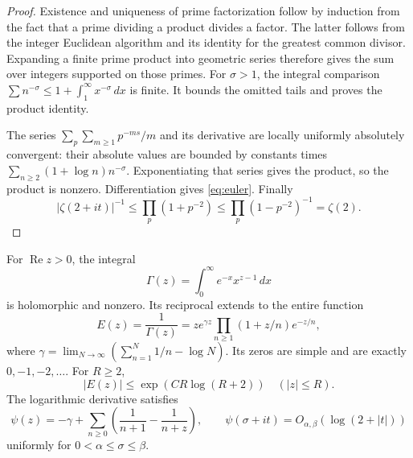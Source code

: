 \begin{proof}
Existence and uniqueness of prime factorization follow by induction from
the fact that a prime dividing a product divides a factor.  The latter
follows from the integer Euclidean algorithm and its identity for the
greatest common divisor.
Expanding a finite prime product into geometric series therefore gives the
sum over integers supported on those primes.
For $\sigma>1$, the integral comparison
$\sum n^{-\sigma}\leq1+\int_1^\infty x^{-\sigma}\,dx$ is finite.
It bounds the omitted tails and proves the product identity.

The series
$\sum_p\sum_{m\geq1}p^{-ms}/m$ and its derivative are locally uniformly
absolutely convergent: their absolute values are bounded by constants times
$\sum_{n\geq2}(1+\log n)n^{-\sigma}$.
Exponentiating that series gives the product, so the product is nonzero.
Differentiation gives \eqref{eq:euler}.
Finally
\[
 |\zeta(2+it)|^{-1}
 \leq\prod_p(1+p^{-2})\leq\prod_p(1-p^{-2})^{-1}=\zeta(2).
\]
\end{proof}

\begin{lemma}
\label{lem:gamma}
For $\operatorname{Re}z>0$, the integral
\[
 \Gamma(z)=\int_0^\infty e^{-x}x^{z-1}\,dx
\]
is holomorphic and nonzero.  Its reciprocal extends to the entire function
\begin{equation}
 E(z)=\frac1{\Gamma(z)}
 =z e^{\gamma z}\prod_{n\geq1}(1+z/n)e^{-z/n},
 \label{eq:gamma-product}
\end{equation}
where $\gamma=\lim_{N\to\infty}(\sum_{n=1}^N1/n-\log N)$.
Its zeros are simple and are exactly $0,-1,-2,\ldots$.
For $R\geq2$,
\begin{equation}
 |E(z)|\leq\exp(CR\log(R+2))\quad(|z|\leq R).
 \label{eq:reciprocal-growth}
\end{equation}
The logarithmic derivative satisfies
\begin{equation}
 \psi(z)=-\gamma+\sum_{n\geq0}
           \left(\frac1{n+1}-\frac1{n+z}\right),
 \qquad
 \psi(\sigma+it)=O_{\alpha,\beta}(\log(2+|t|))
 \label{eq:digamma}
\end{equation}
uniformly for $0<\alpha\leq\sigma\leq\beta$.
\end{lemma}

